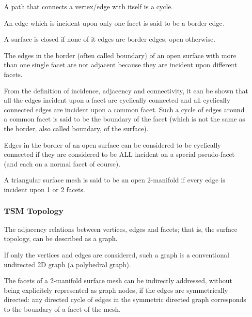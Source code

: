 A path that connects a vertex/edge with itself is a cycle.

An edge which is incident upon only one facet is said to be a border edge. 

A surface is closed if none of it edges are border edges, open otherwise.

The edges in the border (often called boundary) of an open surface with more than one single facet are not adjacent because they are incident upon different facets.

From the definition of incidence, adjacency and connectivity, it can be shown that all the edges incident upon a facet are cyclically connected and all cyclically connected edges are incident upon a common facet. Such a cycle of edges around a common facet is said to be the boundary of the facet (which is not the same as the border, also called boundary, of the surface).

Edges in the border of an open surface can be considered to be cyclically connected if they are considered to be ALL incident on a special pseudo-facet (and each on a normal facet of course).

A triangular surface mesh is said to be an open 2-manifold if every edge is incident upon 1 or 2 facets.


\subsubsection{TSM Topology}

The adjacency relations between vertices, edges and facets; that is, the surface topology, can be described as a graph.

If only the vertices and edges are considered, such a graph is a conventional undirected 2D graph (a polyhedral graph).

The facets of a 2-manifold surface mesh can be indirectly addressed, without being explicitely represented as graph nodes, if the edges are symmetrically directed: any directed cycle of edges in the symmetric directed graph corresponds to the boundary of a facet of the mesh.

